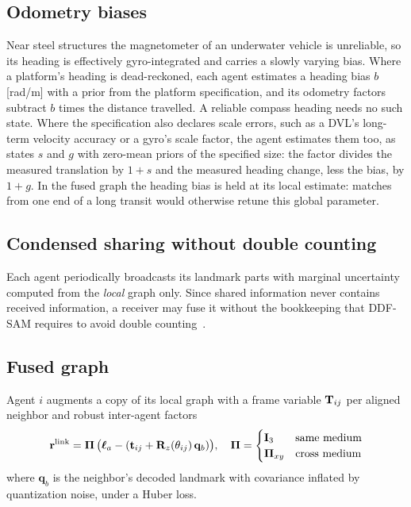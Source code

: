 \subsection{Odometry biases}
Near steel structures the magnetometer of an underwater vehicle is unreliable, so its
heading is effectively gyro-integrated and carries a slowly varying bias. Where a platform's
heading is dead-reckoned, each agent estimates a heading bias $b$ [rad/m] with a prior from
the platform specification, and its odometry factors subtract $b$ times the distance
travelled. A reliable compass heading needs no such state. Where the specification also
declares scale errors, such as a DVL's long-term velocity accuracy or a gyro's scale factor,
the agent estimates them too, as states $s$ and $g$ with zero-mean priors of the specified
size: the factor divides the measured translation by $1+s$ and the measured heading change,
less the bias, by $1+g$. In the fused graph the heading bias is held at its local estimate:
matches from one end of a long transit would otherwise retune this global parameter.

\subsection{Condensed sharing without double counting}
Each agent periodically broadcasts its landmark parts with marginal uncertainty computed from the
\emph{local} graph only. Since shared information never contains received information, a
receiver may fuse it without the bookkeeping that DDF-SAM requires to avoid
double counting~\cite{cunningham2010ddfsam, cunningham2013ddfsam2}. 

\subsection{Fused graph}
Agent $i$ augments a copy of its local graph with a frame variable $\mathbf{T}_{ij}$ per aligned
neighbor and robust inter-agent factors
\begin{equation}
  \mathbf{r}^{\mathrm{link}} = \boldsymbol{\Pi}\,\big(\boldsymbol{\ell}_a - (\mathbf{t}_{ij} + \mathbf{R}_z(\theta_{ij})\,\mathbf{q}_b)\big),
  \quad \boldsymbol{\Pi} = \begin{cases} \mathbf{I}_3 & \text{same medium}\\ \boldsymbol{\Pi}_{xy} & \text{cross medium}\end{cases}
\end{equation}
where $\mathbf{q}_b$ is the neighbor's decoded landmark with covariance inflated by quantization
noise, under a Huber loss.

